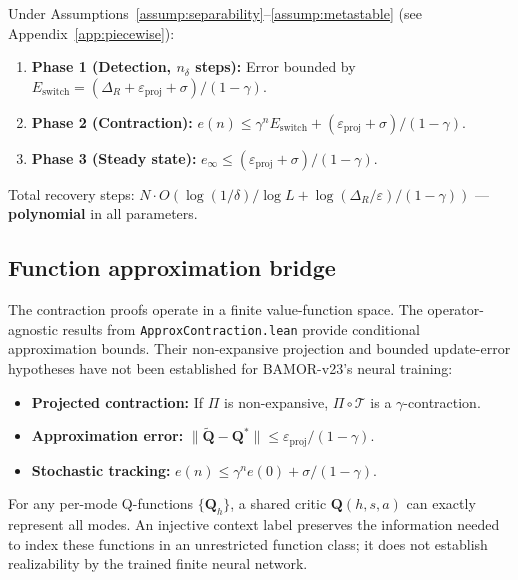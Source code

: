\begin{theorem}
\label{thm:piecewise}
Under Assumptions~\ref{assump:separability}--\ref{assump:metastable} (see Appendix~\ref{app:piecewise}):
\begin{enumerate}
    \item \textbf{Phase 1 (Detection, $n_\delta$ steps):} Error bounded by $E_{\mathrm{switch}} = (\Delta_R + \varepsilon_{\mathrm{proj}} + \sigma)/(1{-}\gamma)$.
    \item \textbf{Phase 2 (Contraction):} $e(n) \le \gamma^n E_{\mathrm{switch}} + (\varepsilon_{\mathrm{proj}} + \sigma)/(1{-}\gamma)$.
    \item \textbf{Phase 3 (Steady state):} $e_\infty \le (\varepsilon_{\mathrm{proj}} + \sigma)/(1{-}\gamma)$.
\end{enumerate}
Total recovery steps: $N \cdot O(\log(1/\delta)/\log L + \log(\Delta_R/\varepsilon)/(1{-}\gamma))$ --- \textbf{polynomial} in all parameters.
\end{theorem}

\subsection{Function approximation bridge}
\label{sec:approx}

The contraction proofs operate in a finite value-function space. The operator-agnostic results from \texttt{ApproxContraction.lean} provide conditional approximation bounds. Their non-expansive projection and bounded update-error hypotheses have not been established for BAMOR-v23's neural training:
\begin{itemize}
    \item \textbf{Projected contraction:} If $\Pi$ is non-expansive, $\Pi \circ \mathcal{T}$ is a $\gamma$-contraction.
    \item \textbf{Approximation error:} $\|\tilde{\mathbf{Q}} - \mathbf{Q}^*\| \le \varepsilon_{\mathrm{proj}}/(1{-}\gamma)$.
    \item \textbf{Stochastic tracking:} $e(n) \le \gamma^n e(0) + \sigma/(1{-}\gamma)$.
\end{itemize}

\begin{theorem}
For any per-mode Q-functions $\{\mathbf{Q}_h\}$, a shared critic $\mathbf{Q}(h, s, a)$ can exactly represent all modes.  An injective context label preserves the information needed to index these functions in an unrestricted function class; it does not establish realizability by the trained finite neural network.
\end{theorem}


